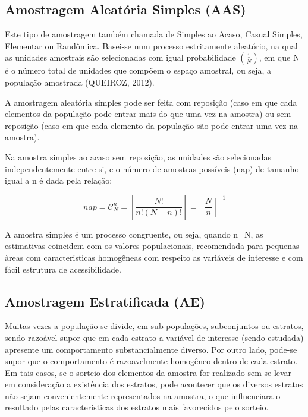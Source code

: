 \subsection{Amostragem Aleatória Simples (AAS)}

\inic Este tipo de amostragem também chamada de Simples ao Acaso,
Casual Simples, Elementar ou Randômica. Basei-se num processo
estritamente aleatório, na qual as unidades amostrais são
selecionadas com igual probabilidade $(\frac{1}{N})$, em que N é o
número total de unidades que compõem o espaço amostral, ou seja, a
população amostrada (QUEIROZ, 2012).\vskip0.3cm


A amostragem aleatória simples pode ser feita com reposição (caso em
que cada elementos da população pode entrar mais do que uma vez na
amostra) ou sem reposição (caso em que cada elemento da população
são pode entrar uma vez na amostra).\vskip0.3cm



Na amostra simples ao acaso sem reposição, as unidades são selecionadas independentemente entre si, e o número de amostras possíveis (nap) de tamanho igual a n é dada pela relação:


\begin{equation}\label{nap}
    nap=  \mathcal{C}_{N}^{n}= \left[\frac{N!}{n!(N-n)!} \right] = \left[\frac{N}{n}\right]^{-1}
\end{equation}

A amostra simples é um processo congruente, ou seja, quando n=N, as estimativas coincidem com os valores populacionais, recomendada para pequenas àreas com caracteristicas homogêneas com respeito as variáveis de interesse e com fácil estrutura de acessibilidade.

\subsection{Amostragem Estratificada (AE)}

\inic Muitas vezes a população se divide, em sub-populações,
subconjuntos ou estratos, sendo razoável supor que em cada estrato
a variável de interesse (sendo estudada) apresente um
comportamento substancialmente diverso. Por outro lado, pode-se
supor que o comportamento é razoavelmente homogêneo dentro de cada
estrato. Em tais casos, se o sorteio dos elementos da amostra for
realizado sem se levar em consideração a existência dos estratos,
pode acontecer que os diversos estratos não sejam convenientemente
representados na amostra, o que influenciara o resultado pelas
características dos estratos mais favorecidos pelo sorteio.\vskip0.3cm

